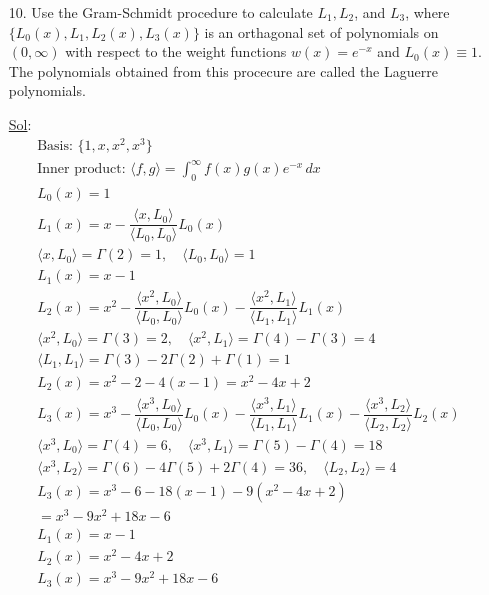 \begin{enumerate}
  \item[10.] Use the Gram-Schmidt procedure to calculate \(L_1,
    L_2\), and \(L_3\), where \(\lbrace L_0 (x), L_1, L_2 (x), L_3
    (x) \rbrace\) is an orthagonal set of polynomials on \((0,
    \infty)\) with respect to the weight functions \(w(x) = e^{-x}\)
    and \(L_0 (x) \equiv 1\). The polynomials obtained from this
    procecure are called the Laguerre polynomials.

    \underline{Sol}:\\

    \[
      \begin{array}{l}
        \text{Basis: } \{1, x, x^2, x^3\} \\
        \text{Inner product: } \langle f,g \rangle =
        \int_{0}^{\infty} f(x)g(x)e^{-x}\,dx \\[6pt]
        L_0(x) = 1 \\[6pt]
        L_1(x) = x - \dfrac{\langle x, L_0 \rangle}{\langle L_0, L_0
        \rangle}L_0(x) \\
        \langle x, L_0 \rangle = \Gamma(2) = 1, \quad \langle L_0,
        L_0 \rangle = 1 \\
        L_1(x) = x - 1 \\[6pt]
        L_2(x) = x^2 - \dfrac{\langle x^2, L_0 \rangle}{\langle L_0,
        L_0 \rangle}L_0(x) - \dfrac{\langle x^2, L_1 \rangle}{\langle
        L_1, L_1 \rangle}L_1(x) \\
        \langle x^2, L_0 \rangle = \Gamma(3) = 2, \quad \langle x^2,
        L_1 \rangle = \Gamma(4) - \Gamma(3) = 4 \\
        \langle L_1, L_1 \rangle = \Gamma(3) - 2\Gamma(2) + \Gamma(1) = 1 \\
        L_2(x) = x^2 - 2 - 4(x - 1) = x^2 - 4x + 2 \\[6pt]
        L_3(x) = x^3 - \dfrac{\langle x^3, L_0 \rangle}{\langle L_0,
        L_0 \rangle}L_0(x) - \dfrac{\langle x^3, L_1 \rangle}{\langle
        L_1, L_1 \rangle}L_1(x) - \dfrac{\langle x^3, L_2
        \rangle}{\langle L_2, L_2 \rangle}L_2(x) \\
        \langle x^3, L_0 \rangle = \Gamma(4) = 6, \quad \langle x^3,
        L_1 \rangle = \Gamma(5) - \Gamma(4) = 18 \\
        \langle x^3, L_2 \rangle = \Gamma(6) - 4\Gamma(5) +
        2\Gamma(4) = 36, \quad \langle L_2, L_2 \rangle = 4 \\
        L_3(x) = x^3 - 6 - 18(x - 1) - 9(x^2 - 4x + 2) \\
        = x^3 - 9x^2 + 18x - 6 \\[6pt]
        \boxed{L_1(x) = x - 1} \\
        \boxed{L_2(x) = x^2 - 4x + 2} \\
        \boxed{L_3(x) = x^3 - 9x^2 + 18x - 6}
      \end{array}
    \]


\end{enumerate}
